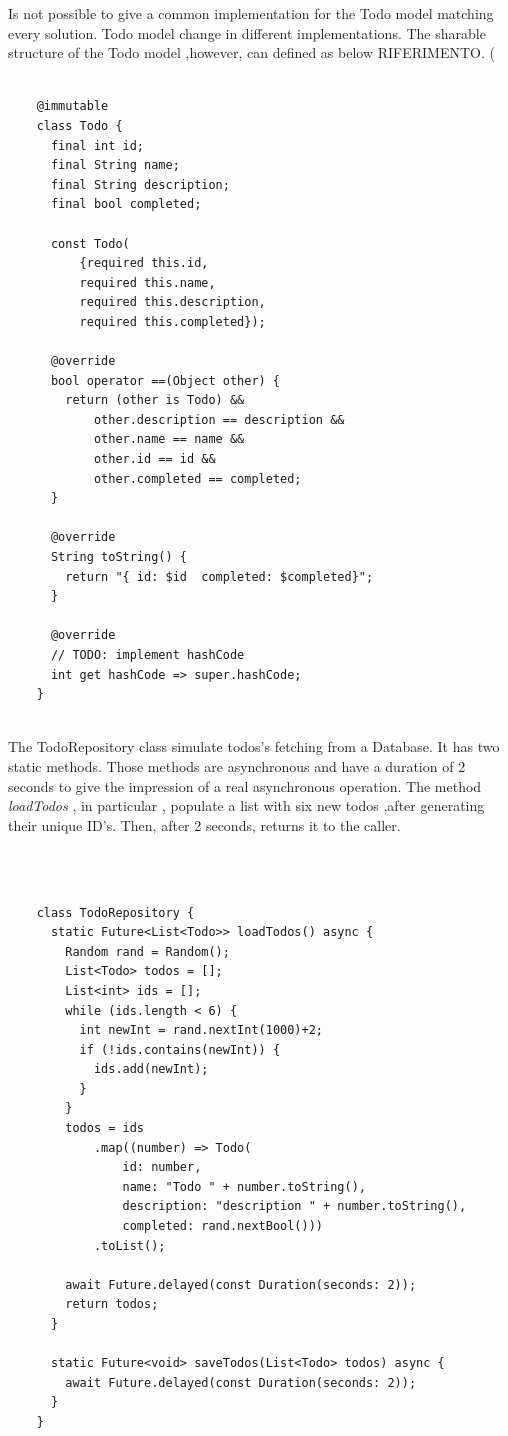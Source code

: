 	\mbox{}
	
Is not possible to give a common implementation for the Todo model matching every solution. Todo model change in different implementations. The sharable structure of the Todo model ,however, can defined as below RIFERIMENTO. (
	\mbox{}\\
	
	 \mbox{}
	\begin{verbatim}
	
	@immutable
	class Todo {
	  final int id;
	  final String name;
	  final String description;
	  final bool completed;
	
	  const Todo(
	      {required this.id,
	      required this.name,
	      required this.description,
	      required this.completed});
	
	  @override
	  bool operator ==(Object other) {
	    return (other is Todo) &&
	        other.description == description &&
	        other.name == name &&
	        other.id == id &&
	        other.completed == completed;
	  }
	
	  @override
	  String toString() {
	    return "{ id: $id  completed: $completed}";
	  }
	
	  @override
	  // TODO: implement hashCode
	  int get hashCode => super.hashCode;
	}
	
	\end{verbatim}
	
	\mbox{}
	
	
The TodoRepository class simulate todos's fetching from a Database. It has two static methods. Those methods are asynchronous and have a duration of 2 seconds to give the impression of a real asynchronous operation. The method \textit{loadTodos} , in particular , populate a list with six new todos ,after generating their unique ID's. Then, after 2 seconds, returns it to the caller.
	
	\mbox{}\\
	
	 \mbox{}
	\begin{verbatim}
	
	class TodoRepository {
	  static Future<List<Todo>> loadTodos() async {
	    Random rand = Random();
	    List<Todo> todos = [];
	    List<int> ids = [];
	    while (ids.length < 6) {
	      int newInt = rand.nextInt(1000)+2;
	      if (!ids.contains(newInt)) {
	        ids.add(newInt);
	      }
	    }
	    todos = ids
	        .map((number) => Todo(
	            id: number,
	            name: "Todo " + number.toString(),
	            description: "description " + number.toString(),
	            completed: rand.nextBool()))
	        .toList();
	
	    await Future.delayed(const Duration(seconds: 2));
	    return todos;
	  }
	
	  static Future<void> saveTodos(List<Todo> todos) async {
	    await Future.delayed(const Duration(seconds: 2));
	  }
	}
	
	
	\end{verbatim}
	
